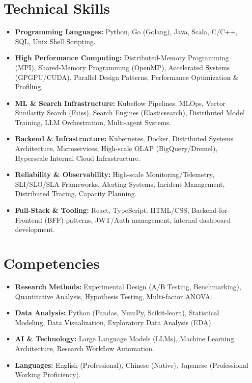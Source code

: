 \documentclass[10pt,a4paper]{article}
\begin{document}
\section{Technical Skills}
\begin{itemize}[noitemsep, leftmargin=*]
    \item \textbf{Programming Languages:} Python, Go (Golang), Java, Scala, C/C++, SQL, Unix Shell Scripting.
    \item \textbf{High Performance Computing:} Distributed-Memory Programming (MPI), Shared-Memory Programming (OpenMP), Accelerated Systems (GPGPU/CUDA), Parallel Design Patterns, Performance Optimization \& Profiling.
    \item \textbf{ML \& Search Infrastructure:} Kubeflow Pipelines, MLOps, Vector Similarity Search (Faiss), Search Engines (Elasticsearch), Distributed Model Training, LLM Orchestration, Multi-agent Systems.
    \item \textbf{Backend \& Infrastructure:} Kubernetes, Docker, Distributed Systems Architecture, Microservices, High-scale OLAP (BigQuery/Dremel), Hyperscale Internal Cloud Infrastructure.
    \item \textbf{Reliability \& Observability:} High-scale Monitoring/Telemetry, SLI/SLO/SLA Frameworks, Alerting Systems, Incident Management, Distributed Tracing, Capacity Planning.
    \item \textbf{Full-Stack \& Tooling:} React, TypeScript, HTML/CSS, Backend-for-Frontend (BFF) patterns, JWT/Auth management, internal dashboard development.
\end{itemize}

\section{Competencies}
\begin{itemize}[noitemsep, leftmargin=*]
    \item \textbf{Research Methods:} Experimental Design (A/B Testing, Benchmarking), Quantitative Analysis, Hypothesis Testing, Multi-factor ANOVA.
    \item \textbf{Data Analysis:} Python (Pandas, NumPy, Scikit-learn), Statistical Modeling, Data Visualization, Exploratory Data Analysis (EDA).
    \item \textbf{AI \& Technology:} Large Language Models (LLMs), Machine Learning Architecture, Research Workflow Automation.
    \item \textbf{Languages:} English (Professional), Chinese (Native), Japanese (Professional Working Proficiency).
\end{itemize}
\end{document}
